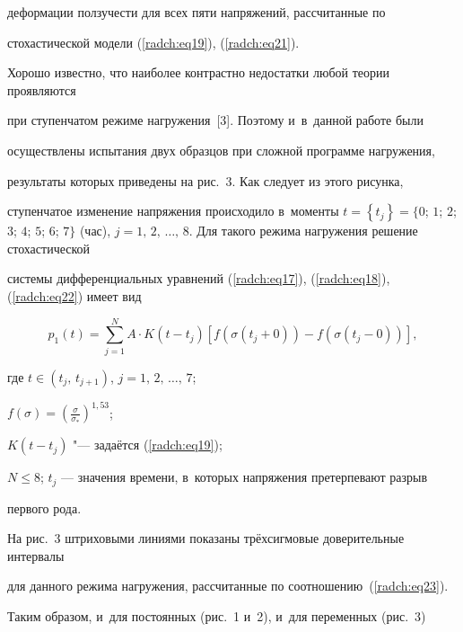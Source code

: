 деформации ползучести для всех пяти напряжений, рассчитанные по 

стохастической модели (\ref{radch:eq19}), (\ref{radch:eq21}).



Хорошо известно, что наиболее контрастно недостатки любой теории проявляются 

при ступенчатом режиме нагружения~[3]. Поэтому и~в~данной работе были 

осуществлены испытания двух образцов при сложной программе нагружения, 

результаты которых приведены на рис.~3. Как следует из этого рисунка, 

ступенчатое изменение напряжения происходило в~моменты $t = \left\{ {t_j } 

\right\} = \{ 0$; $1$; $2$; $3$; $4$; $5$; $6$; $7\}$ (час), $j=1,\, 2,\, \dots,\, 8$. Для такого режима нагружения решение стохастической 

системы дифференциальных уравнений (\ref{radch:eq17}), (\ref{radch:eq18}), (\ref{radch:eq22}) имеет вид

\begin{equation}

\label{radch:eq23}

p_1 \left( t \right) = \sum\limits_{j = 1}^N {A \cdot K\left( {t - t_j } 

\right)\left[ {f\left( {\sigma \left( {t_j + 0} \right)} \right) - f\left( 

{\sigma \left( {t_j - 0} \right)} \right)} \right]} ,

\end{equation}

где $t \in \left( {t_j,\, t_{j + 1} } \right)$, $j=1,\, 2,\, \dots,\, 7$; 

$f\left( \sigma \right) = \left( {\frac{\sigma }{\sigma _ * }} \right)^{1,53}$; 

$K\left( {t - t_j } \right)$ "--- задаётся (\ref{radch:eq19}); 

$N \leqslant 8$; $t_j$ --- значения времени, в~которых напряжения претерпевают разрыв 

первого рода.



На рис.~3 штриховыми линиями показаны трёхсигмовые доверительные интервалы 

для данного режима нагружения, рассчитанные по соотношению~(\ref{radch:eq23}).



Таким образом, и~для постоянных (рис.~1 и~2), и~для переменных (рис.~3) 

